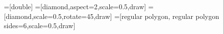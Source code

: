 \usepackage{tikz}
\usetikzlibrary{shapes}
=[double]
=[diamond,aspect=2,scale=0.5,draw]
=[diamond,scale=0.5,rotate=45,draw]
=[regular polygon, regular polygon sides=6,scale=0.5,draw]
